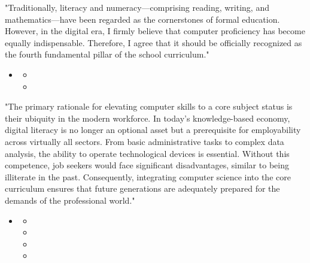 \documentclass{../templateWriting/cdwriting}
\begin{document}


"Traditionally, literacy and numeracy—comprising reading, writing, and mathematics—have been regarded as the cornerstones of formal education. However, in the digital era, I firmly believe that computer proficiency has become equally indispensable. Therefore, I agree that it should be officially recognized as the fourth fundamental pillar of the school curriculum."
\begin{itemize}
\item {}
\begin{itemize}
\item {}
\item {}
\end{itemize}
\end{itemize}


"The primary rationale for elevating computer skills to a core subject status is their ubiquity in the modern workforce. In today's knowledge-based economy, digital literacy is no longer an optional asset but a prerequisite for employability across virtually all sectors. From basic administrative tasks to complex data analysis, the ability to operate technological devices is essential. Without this competence, job seekers would face significant disadvantages, similar to being illiterate in the past. Consequently, integrating computer science into the core curriculum ensures that future generations are adequately prepared for the demands of the professional world."
\begin{itemize}
\item {}
\begin{itemize}
\item {}
\item {}
\item {}
\item {}
\end{itemize}
\end{itemize}
\end{document}
